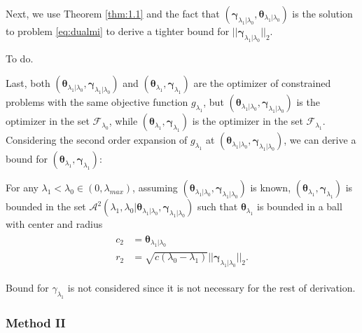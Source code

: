 Next, we use Theorem \ref{thm:1.1} and the fact that $(\boldsymbol\gamma_{\lambda_1|\lambda_0},\boldsymbol\theta_{\lambda_1|\lambda_0})$ is the solution to problem \ref{eq:dualmi} to derive a tighter bound for $||\boldsymbol\gamma_{\lambda_1|\lambda_0}||_2$.

\begin{theorem}
    \label{thm:1.2}
    To do.
\end{theorem}

Last, both $(\boldsymbol\theta_{\lambda_1|\lambda_0},\boldsymbol\gamma_{\lambda_1|\lambda_0})$ and $(\boldsymbol\theta_{\lambda_1},\boldsymbol\gamma_{\lambda_1})$ are the optimizer of constrained problems with the same objective function $g_{\lambda_1}$, but $(\boldsymbol\theta_{\lambda_1|\lambda_0},\boldsymbol\gamma_{\lambda_1|\lambda_0})$ is the optimizer in the set $\mathcal{F}_{\lambda_0}$, while $(\boldsymbol\theta_{\lambda_1},\boldsymbol\gamma_{\lambda_1})$ is the optimizer in the set $\mathcal{F}_{\lambda_1}$. Considering the second order expansion of $g_{\lambda_1}$ at $(\boldsymbol\theta_{\lambda_1|\lambda_0},\boldsymbol\gamma_{\lambda_1|\lambda_0})$, we can derive a bound for $(\boldsymbol\theta_{\lambda_1},\boldsymbol\gamma_{\lambda_1})$:

\begin{theorem}
    \label{thm:1.3}
    For any $\lambda_1<\lambda_{0}\in (0,\lambda_{max})$, assuming $(\boldsymbol\theta_{\lambda_1|\lambda_0},\boldsymbol\gamma_{\lambda_1|\lambda_0})$ is known, $(\boldsymbol\theta_{\lambda_1},\boldsymbol\gamma_{\lambda_1})$ is bounded in the set $\mathcal{A}^2(\lambda_1,\lambda_0|\boldsymbol\theta_{\lambda_1|\lambda_0},\boldsymbol\gamma_{\lambda_1|\lambda_0})$ such that $\boldsymbol\theta_{\lambda_1}$ is bounded in a ball with center and radius
    \begin{gather}
        \begin{aligned}
            c_2&=\boldsymbol\theta_{\lambda_1|\lambda_0}\\
            r_2&=\sqrt{c(\lambda_0-\lambda_1)}||\boldsymbol\gamma_{\lambda_1|\lambda_0}||_2.
        \end{aligned}
    \end{gather}
\end{theorem}

Bound for $\gamma_{\lambda_1}$ is not considered since it is not necessary for the rest of derivation.

\subsubsection{Method II}

